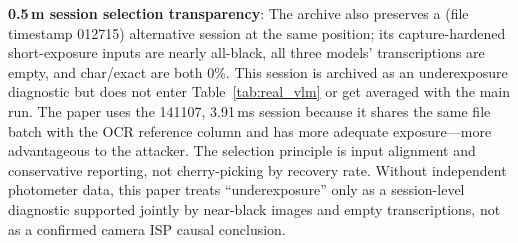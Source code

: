 \documentclass{ieeeaccess}
\begin{document}
\textbf{0.5\,m session selection transparency}: The archive also preserves a  (file timestamp 012715) alternative session at the same position; its capture-hardened short-exposure inputs are nearly all-black, all three models' transcriptions are empty, and char/exact are both 0\%. This session is archived as an underexposure diagnostic but does not enter Table~\ref{tab:real_vlm} or get averaged with the main run. The paper uses the 141107, 3.91\,ms session because it shares the same file batch with the OCR reference column and has more adequate exposure---more advantageous to the attacker. The selection principle is input alignment and conservative reporting, not cherry-picking by recovery rate. Without independent photometer data, this paper treats ``underexposure'' only as a session-level diagnostic supported jointly by near-black images and empty transcriptions, not as a confirmed camera ISP causal conclusion.
\end{document}
